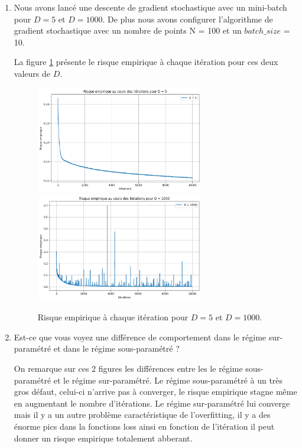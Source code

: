 \documentclass[12pt,a4paper]{article}
\begin{document}
\begin{enumerate}
    \item Nous avons lancé une descente de gradient stochastique avec un mini-batch pour $D = 5$ et $D = 1000$. De plus nous avons configurer l'algorithme de gradient stochastique avec un nombre de points N = 100 et un $batch\_size $ = 10.

    La figure \ref{fig:gradient_stochastique} présente le risque empirique à chaque itération pour ces deux valeurs de $D$.

    \begin{figure}[t]
        \centering
        \includegraphics[width=7.3cm]{src/gradient_stochastique_5.png}
        \hfill
        \includegraphics[width=7.3cm]{src/gradient_stochastique_1000.png}
        \caption{Risque empirique à chaque itération pour $D = 5$ et $D = 1000$.}
        \label{fig:gradient_stochastique}
    \end{figure}

    \newpage

    \item Est-ce que vous voyez une différence de comportement dans le régime sur-paramétré et dans le régime sous-paramétré ?

    On remarque sur ces 2 figures les différences entre les le régime sous-paramétré et le régime sur-paramétré. Le régime sous-paramétré à un très gros défaut, celui-ci n'arrive pas à converger, le risque empirique stagne même en augmentant le nombre d'itérations.
    Le régime sur-paramétré lui converge mais il y a un autre problème caractéristique de l'overfitting, il y a des énorme pics dans la fonctions loss ainsi en fonction de l'itération il peut donner un risque empirique totalement abberant.

\end{enumerate}
\end{document}
